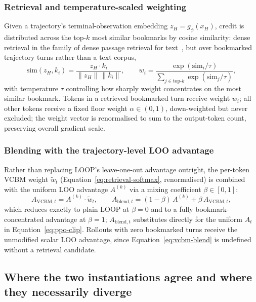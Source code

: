 \subsubsection{Retrieval and temperature-scaled weighting}
Given a trajectory's terminal-observation embedding $z_H = g_\phi(x_H)$, credit is distributed across the top-$k$ most similar bookmarks by cosine similarity: dense retrieval in the family of dense passage retrieval for text~\cite{karpukhin2020dpr}, but over bookmarked trajectory turns rather than a text corpus,
\begin{equation}
  \mathrm{sim}(z_H, k_i) = \frac{z_H \cdot k_i}{\lVert z_H \rVert \, \lVert k_i \rVert}, \qquad
  w_i = \frac{\exp(\mathrm{sim}_i / \tau)}{\sum_{j \in \mathrm{top}\text{-}k} \exp(\mathrm{sim}_j / \tau)} ,
  \label{eq:retrieval-softmax}
\end{equation}
with temperature $\tau$ controlling how sharply weight concentrates on the most similar bookmark. Tokens in a retrieved bookmarked turn receive weight $w_i$; all other tokens receive a fixed floor weight $\alpha \in (0,1)$, down-weighted but never excluded; the weight vector is renormalised to sum to the output-token count, preserving overall gradient scale.

\subsubsection{Blending with the trajectory-level LOO advantage}
Rather than replacing LOOP's leave-one-out advantage outright, the per-token VCBM weight $\tilde{w}_t$ (Equation~\ref{eq:retrieval-softmax}, renormalised) is combined with the uniform LOO advantage $A^{(k)}$ via a mixing coefficient $\beta \in [0,1]$:
\begin{equation}
  A_{\mathrm{VCBM},t} = A^{(k)} \cdot \tilde{w}_t, \qquad
  A_{\mathrm{blend},t} = (1-\beta)\, A^{(k)} + \beta\, A_{\mathrm{VCBM},t} ,
  \label{eq:vcbm-blend}
\end{equation}
which reduces exactly to plain LOOP at $\beta=0$ and to a fully bookmark-concentrated advantage at $\beta=1$; $A_{\mathrm{blend},t}$ substitutes directly for the uniform $A_t$ in Equation~\ref{eq:ppo-clip}. Rollouts with zero bookmarked turns receive the unmodified scalar LOO advantage, since Equation~\ref{eq:vcbm-blend} is undefined without a retrieval candidate.

\subsection{Where the two instantiations agree and where they necessarily diverge}
\label{sec:vcbm-comparison}

